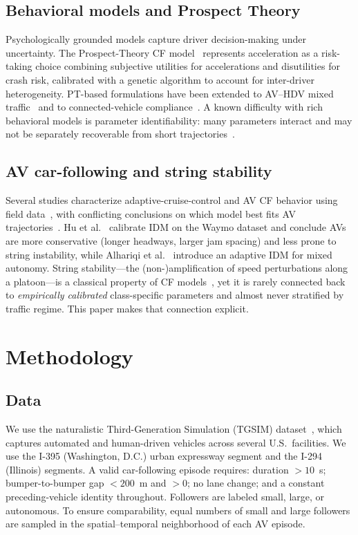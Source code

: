\documentclass[11pt]{article}
\begin{document}
\subsection{Behavioral models and Prospect Theory}
Psychologically grounded models capture driver decision-making under
uncertainty. The Prospect-Theory CF model~\cite{hamdar2008rec,hamdar2015}
represents acceleration as a risk-taking choice combining subjective utilities
for accelerations and disutilities for crash risk, calibrated with a genetic
algorithm to account for inter-driver heterogeneity. PT-based formulations have
been extended to AV--HDV mixed traffic~\cite{adewale2024,ding2021} and to
connected-vehicle compliance~\cite{sharma2019}. A known difficulty with rich
behavioral models is parameter identifiability: many parameters interact and may
not be separately recoverable from short trajectories~\cite{punzo2012}.

\subsection{AV car-following and string stability}
Several studies characterize adaptive-cruise-control and AV CF behavior using
field data~\cite{li2021,makridis2021}, with conflicting conclusions on which
model best fits AV trajectories~\cite{kim2023,bai2024}. Hu et al.~\cite{hu2023}
calibrate IDM on the Waymo dataset and conclude AVs are more conservative (longer
headways, larger jam spacing) and less prone to string instability, while
Alhariqi et al.~\cite{alhariqi2022} introduce an adaptive IDM for mixed autonomy.
String stability---the (non-)amplification of speed perturbations along a
platoon---is a classical property of CF models~\cite{treiber2013,wilson2011}, yet
it is rarely connected back to \emph{empirically calibrated} class-specific
parameters and almost never stratified by traffic regime. This paper makes that
connection explicit.

\section{Methodology}

\subsection{Data}
We use the naturalistic Third-Generation Simulation (TGSIM)
dataset~\cite{ammourah2024}, which captures automated and human-driven vehicles
across several U.S.\ facilities. We use the I-395 (Washington, D.C.) urban
expressway segment and the I-294 (Illinois) segments. A valid car-following
episode requires: duration $>10$~s; bumper-to-bumper gap $<200$~m and $>0$; no
lane change; and a constant preceding-vehicle identity throughout. Followers are
labeled small, large, or autonomous. To ensure comparability, equal numbers of
small and large followers are sampled in the spatial--temporal neighborhood of
each AV episode.
\end{document}
